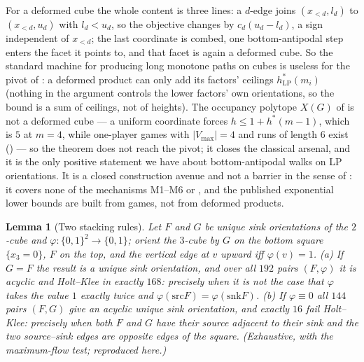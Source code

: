 \documentclass[11pt]{article}
\theoremstyle{plain}
\newtheorem{lemma}[theorem]{Lemma}
\theoremstyle{definition}
\newcommand{\Vmax}{V_{\max}}
\begin{document}
For a deformed cube the whole content is three lines: a $d$-edge joins
$(x_{<d},l_d)$ to $(x_{<d},u_d)$ with $l_d<u_d$, so the objective changes
by $c_d(u_d-l_d)$, a sign independent of $x_{<d}$; the last coordinate is
combed, one bottom-antipodal step enters the facet it points to, and that
facet is again a deformed cube. So the standard machine for producing long
monotone paths on cubes is useless for the pivot of : a
deformed product can only add its factors' ceilings $h^{\ast}_{\mathrm{LP}}(m_i)$
(nothing in the argument controls the lower factors' own orientations, so
the bound is a sum of ceilings, not of heights). The occupancy polytope $X(G)$ of
 is not a deformed cube --- a uniform coordinate
forces $h\le1+h^{\ast}(m-1)$, which is $5$ at $m=4$, while one-player
games with $|\Vmax|=4$ and runs of length $6$ exist
() --- so the theorem does not reach the pivot; it
closes the classical arsenal, and it is the only positive statement we
have about bottom-antipodal walks on LP orientations. It is a closed
construction avenue and not a barrier in the sense of : it
covers none of the mechanisms M1--M6 or , and the published
exponential lower bounds are built from games, not from deformed
products.

\begin{lemma}[Two stacking rules]\label{lem:stack}
Let $F$ and $G$ be unique sink orientations of the $2$-cube and
$\varphi:\{0,1\}^{2}\to\{0,1\}$; orient the $3$-cube by $G$ on the bottom
square $\{x_3=0\}$, $F$ on the top, and the vertical edge at $v$ upward
iff $\varphi(v)=1$. (a) If $G=F$ the result is a unique sink orientation,
and over all $192$ pairs $(F,\varphi)$ it is acyclic and Holt--Klee in
exactly $168$: precisely when it is not the case that $\varphi$ takes the
value $1$ exactly twice and $\varphi(\mathrm{src}F)=\varphi(\mathrm{snk}F)$.
(b) If $\varphi\equiv0$ all $144$ pairs $(F,G)$ give an acyclic unique
sink orientation, and exactly $16$ fail Holt--Klee: precisely when both
$F$ and $G$ have their source adjacent to their sink and the two
source--sink edges are opposite edges of the square. (Exhaustive, with the
maximum-flow test; reproduced here.)
\end{lemma}
\end{document}
